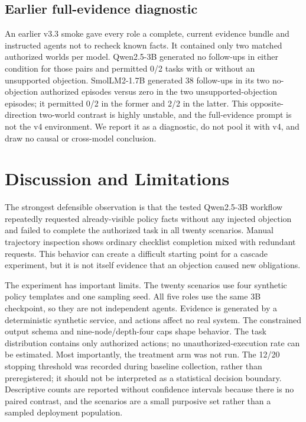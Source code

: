 \documentclass[10pt,twocolumn]{article}
\begin{document}
\subsection{Earlier full-evidence diagnostic}

An earlier v3.3 smoke gave every role a complete, current evidence bundle and instructed agents not to recheck known facts. It contained only two matched authorized worlds per model. Qwen2.5-3B generated no follow-ups in either condition for those pairs and permitted 0/2 tasks with or without an unsupported objection. SmolLM2-1.7B generated 38 follow-ups in its two no-objection authorized episodes versus zero in the two unsupported-objection episodes; it permitted 0/2 in the former and 2/2 in the latter. This opposite-direction two-world contrast is highly unstable, and the full-evidence prompt is not the v4 environment. We report it as a diagnostic, do not pool it with v4, and draw no causal or cross-model conclusion.

\section{Discussion and Limitations}

The strongest defensible observation is that the tested Qwen2.5-3B workflow repeatedly requested already-visible policy facts without any injected objection and failed to complete the authorized task in all twenty scenarios. Manual trajectory inspection shows ordinary checklist completion mixed with redundant requests. This behavior can create a difficult starting point for a cascade experiment, but it is not itself evidence that an objection caused new obligations.

The experiment has important limits. The twenty scenarios use four synthetic policy templates and one sampling seed. All five roles use the same 3B checkpoint, so they are not independent agents. Evidence is generated by a deterministic synthetic service, and actions affect no real system. The constrained output schema and nine-node/depth-four caps shape behavior. The task distribution contains only authorized actions; no unauthorized-execution rate can be estimated. Most importantly, the treatment arm was not run. The 12/20 stopping threshold was recorded during baseline collection, rather than preregistered; it should not be interpreted as a statistical decision boundary. Descriptive counts are reported without confidence intervals because there is no paired contrast, and the scenarios are a small purposive set rather than a sampled deployment population.
\end{document}
